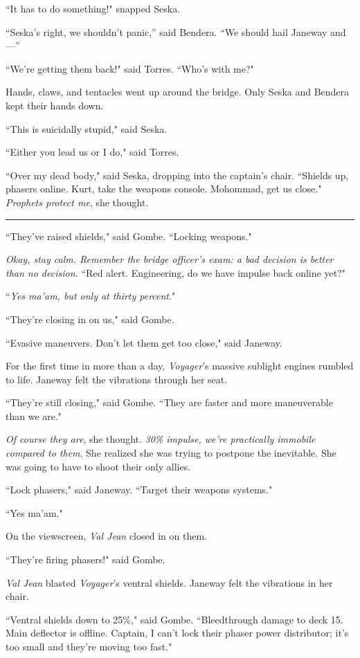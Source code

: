 \documentclass[twoside,letterpaper,12pt]{memoir}
\begin{document}
``It has to do something!" snapped Seska.

``Seska’s right, we shouldn’t panic,'' said Bendera. ``We should hail Janeway and—''

``We're getting them back!" said Torres. ``Who's with me?"

Hands, claws, and tentacles went up around the bridge. Only Seska and Bendera kept their hands down.

``This is suicidally stupid," said Seska.

``Either you lead us or I do," said Torres.

``Over my dead body," said Seska, dropping into the captain's chair. ``Shields up, phasers online. Kurt, take the weapons console. Mohommad, get us close." \textit{Prophets protect me}, she thought.

\fancybreak{\rule{3cm}{0.4 pt}}
\noindent``They've raised shields," said Gombe. ``Locking weapons."

\textit{Okay, stay calm. Remember the bridge officer's exam: a bad decision is better than no decision.} ``Red alert. Engineering, do we have impulse back online yet?"

``\textit{Yes ma'am, but only at thirty percent}."

``They're closing in on us," said Gombe.

``Evasive maneuvers. Don't let them get too close," said Janeway.

For the first time in more than a day, \textit{Voyager}'s massive sublight engines rumbled to life. Janeway felt the vibrations through her seat.

``They're still closing," said Gombe. ``They are faster and more maneuverable than we are."

\textit{Of course they are}, she thought. \textit{30\% impulse, we're practically immobile compared to them}. She realized she was trying to postpone the inevitable. She was going to have to shoot their only allies.

``Lock phasers," said Janeway. ``Target their weapons systems."

``Yes ma'am."

On the viewscreen, \textit{Val Jean} closed in on them.

``They're firing phasers!" said Gombe.

\textit{Val Jean} blasted \textit{Voyager}'s ventral shields. Janeway felt the vibrations in her chair.

``Ventral shields down to 25\%," said Gombe. ``Bleedthrough damage to deck 15. Main deflector is offline. Captain, I can't lock their phaser power distributor; it’s too small and they’re moving too fast."
\end{document}
